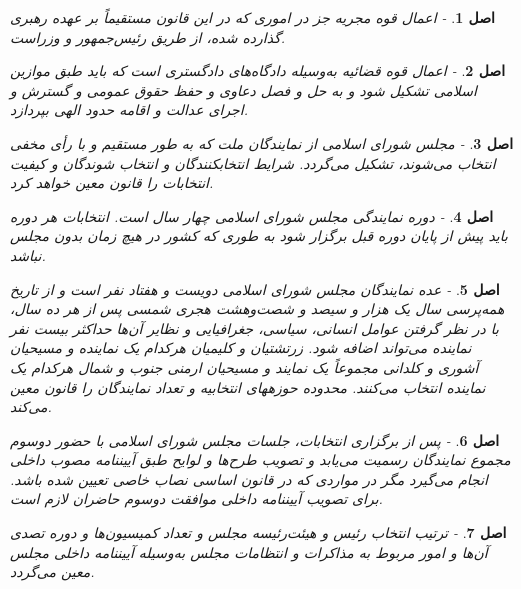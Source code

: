 \documentclass[12pt]{article}
\newtheorem{asl}{اصل}
\begin{document}
\begin{asl}- 
اعمال قوه مجریه جز در اموری که در این قانون مستقیماً بر عهده رهبری گذارده شده‌، از طریق رئیس‌جمهور و وزراست.
\end{asl}

\begin{asl}- 
اعمال قوه قضائیه به‌وسیله دادگاه‌های دادگستری است که باید طبق موازین اسلامی تشکیل شود و به حل و فصل دعاوی و حفظ حقوق عمومی و گسترش و اجرای عدالت و اقامه حدود الهی بپردازد.
\end{asl}

\begin{asl}- 
مجلس شورای اسلامی از نمایندگان ملت که به طور مستقیم و با رأی مخفی انتخاب می‌شوند، تشکیل می‌گردد. شرایط انتخاب‏کنندگان و انتخاب شوندگان و کیفیت انتخابات را قانون معین خواهد کرد.
\end{asl}

\begin{asl}- 
دوره نمایندگی مجلس شورای اسلامی چهار سال است. انتخابات هر دوره باید پیش از پایان دوره قبل برگزار شود به طوری که کشور در هیچ زمان بدون مجلس نباشد.
\end{asl}

\begin{asl}- 
عده نمایندگان مجلس شورای اسلامی دویست و هفتاد نفر است و از تاریخ همه‌‏پرسی سال یک هزار و سیصد و شصت‌وهشت هجری شمسی پس از هر ده سال، با در نظر گرفتن عوامل انسانی، سیاسی، جغرافیایی و نظایر آن‌ها حداکثر بیست نفر نماینده می‌تواند اضافه شود. زرتشتیان و کلیمیان هرکدام یک نماینده و مسیحیان آشوری و کلدانی مجموعاً یک نمایند و مسیحیان ارمنی جنوب و شمال هرکدام یک نماینده انتخاب می‌کنند. محدوده حوزه‏های انتخابیه و تعداد نمایندگان را قانون معین می‌کند.
\end{asl}

\begin{asl}- 
پس از برگزاری انتخابات، جلسات مجلس شورای اسلامی با حضور دوسوم مجموع نمایندگان رسمیت می‌یابد و تصویب طرح‌ها و لوایح طبق آیین‏نامه مصوب داخلی انجام می‌گیرد مگر در مواردی که در قانون اساسی نصاب خاصی تعیین شده باشد. برای تصویب آیین‏نامه داخلی موافقت دوسوم حاضران لازم است.
\end{asl}

\begin{asl}- 
ترتیب انتخاب رئیس و هیئت‌رئیسه مجلس و تعداد کمیسیون‌ها و دوره تصدی آن‌ها و امور مربوط به مذاکرات و انتظامات مجلس به‌وسیله آیین‏نامه داخلی مجلس معین می‌گردد.
\end{asl}
\end{document}
